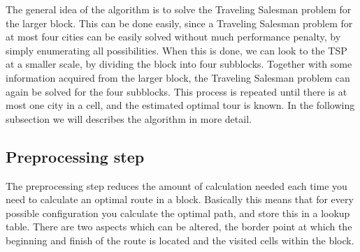 The general idea of the algorithm is to solve the Traveling Salesman problem
for the larger block. This can be done easily, since a Traveling Salesman
problem for at most four cities can be easily solved without much performance
penalty, by simply enumerating all possibilities. When this is done, we can
look to the TSP at a smaller scale, by dividing the block into four subblocks.
Together with some information acquired from the larger block, the Traveling
Salesman problem can again be solved for the four subblocks. This process is
repeated until there is at most one city in a cell, and the estimated optimal
tour is known. In the following subsection we will describes the algorithm in
more detail.

\subsection{Preprocessing step}

The preprocessing step reduces the amount of calculation needed each time you
need to calculate an optimal route in a block. Basically this means that for
every possible configuration you calculate the optimal path, and store this in
a lookup table. There are two aspects which can be altered, the border point at
which the beginning and finish of the route is located and the visited cells
within the block.

